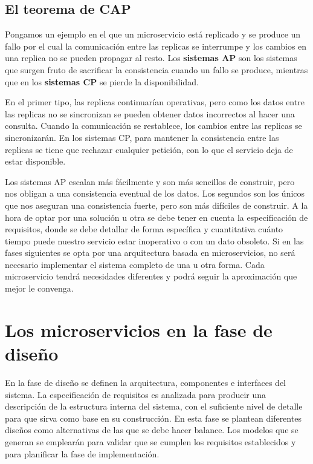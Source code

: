 \documentclass[11pt,spanish,listoffigures,listoftables]{tfgetsinf}
\begin{document}
\subsection{El teorema de CAP}

Pongamos un ejemplo en el que un microservicio está replicado y se produce un fallo por el cual la comunicación entre las replicas se interrumpe y los cambios en una replica no se pueden propagar al resto. Los \textbf{sistemas AP} son los sistemas que surgen fruto de sacrificar la consistencia cuando un fallo se produce, mientras que en los \textbf{sistemas CP} se pierde la disponibilidad. 

En el primer tipo, las replicas continuarían operativas, pero como los datos entre las replicas no se sincronizan se pueden obtener datos incorrectos al hacer una consulta. Cuando la comunicación se restablece, los cambios entre las replicas se sincronizarán. En los sistemas CP, para mantener la consistencia entre las replicas se tiene que rechazar cualquier petición, con lo que el servicio deja de estar disponible.

Los sistemas AP escalan más fácilmente y son más sencillos de construir, pero nos obligan a una consistencia eventual de los datos. Los segundos son los únicos que nos aseguran una consistencia fuerte, pero son más difíciles de construir. A la hora de optar por una solución u otra se debe tener en cuenta la especificación de requisitos, donde se debe detallar de forma específica y cuantitativa cuánto tiempo puede nuestro servicio estar inoperativo o con un dato obsoleto. Si en las fases siguientes se opta por una arquitectura basada en microservicios, no será necesario implementar el sistema completo de una u otra forma. Cada microservicio tendrá necesidades diferentes y podrá seguir la aproximación que mejor le convenga. \cite{Newman2015a}

\section{Los microservicios en la fase de diseño}

En la fase de diseño se definen la arquitectura, componentes e interfaces del sistema. La especificación de requisitos es analizada para producir una descripción de la estructura interna del sistema, con el suficiente nivel de detalle para que sirva como base en su construcción. En esta fase se plantean diferentes diseños como alternativas de las que se debe hacer balance. Los modelos que se generan se emplearán para validar que se cumplen los requisitos establecidos y para planificar la fase de implementación. \cite{Bourque2014}
\end{document}
